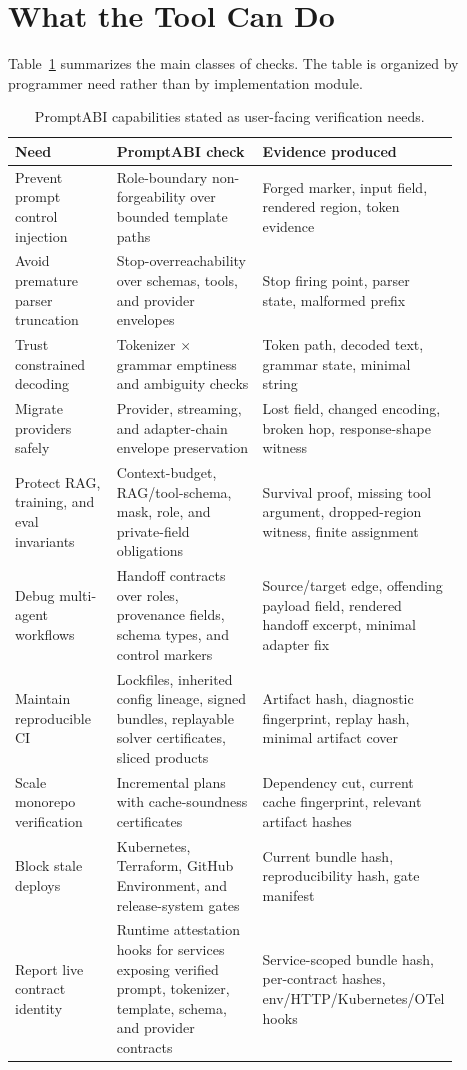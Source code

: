 \documentclass[10pt]{article}
\begin{document}
\section{What the Tool Can Do}

Table~\ref{tab:capabilities} summarizes the main classes of checks. The table is
organized by programmer need rather than by implementation module.

\begin{table}[h]
\centering
\small
\begin{tabular}{p{0.24\linewidth}p{0.36\linewidth}p{0.28\linewidth}}
\toprule
Need & PromptABI check & Evidence produced \\
\midrule
Prevent prompt control injection &
Role-boundary non-forgeability over bounded template paths &
Forged marker, input field, rendered region, token evidence \\
\addlinespace
Avoid premature parser truncation &
Stop-overreachability over schemas, tools, and provider envelopes &
Stop firing point, parser state, malformed prefix \\
\addlinespace
Trust constrained decoding &
Tokenizer $\times$ grammar emptiness and ambiguity checks &
Token path, decoded text, grammar state, minimal string \\
\addlinespace
Migrate providers safely &
Provider, streaming, and adapter-chain envelope preservation &
Lost field, changed encoding, broken hop, response-shape witness \\
\addlinespace
Protect RAG, training, and eval invariants &
Context-budget, RAG/tool-schema, mask, role, and private-field obligations &
Survival proof, missing tool argument, dropped-region witness, finite assignment \\
\addlinespace
Debug multi-agent workflows &
Handoff contracts over roles, provenance fields, schema types, and control
markers &
Source/target edge, offending payload field, rendered handoff excerpt, minimal
adapter fix \\
\addlinespace
Maintain reproducible CI &
Lockfiles, inherited config lineage, signed bundles, replayable solver
certificates, sliced products &
Artifact hash, diagnostic fingerprint, replay hash, minimal artifact cover \\
\addlinespace
Scale monorepo verification &
Incremental plans with cache-soundness certificates &
Dependency cut, current cache fingerprint, relevant artifact hashes \\
\addlinespace
Block stale deploys &
Kubernetes, Terraform, GitHub Environment, and release-system gates &
Current bundle hash, reproducibility hash, gate manifest \\
\addlinespace
Report live contract identity &
Runtime attestation hooks for services exposing verified prompt, tokenizer,
template, schema, and provider contracts &
Service-scoped bundle hash, per-contract hashes, env/HTTP/Kubernetes/OTel hooks \\
\bottomrule
\end{tabular}
\caption{PromptABI capabilities stated as user-facing verification needs.}
\label{tab:capabilities}
\end{table}
\end{document}
